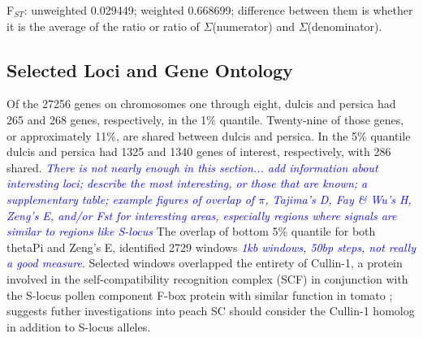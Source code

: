 \documentclass[12pt]{article}
\newcommand{\jri}[1]{\textcolor{red}{\emph{#1}}}
\newcommand{\dv}[1]{\textcolor{blue}{\emph{#1}}}
\begin{document}
F$_{ST}$: unweighted 0.029449; weighted 0.668699; difference between them is whether it is the average of the ratio or ratio of $\Sigma$(numerator) and $\Sigma$(denominator).

%
\subsection*{Selected Loci and Gene Ontology}
Of the 27256 genes on chromosomes one through eight, dulcis and persica had 265 and 268 genes, respectively, in the 1\% quantile. 
%
Twenty-nine of those genes, or approximately 11\%, are shared between dulcis and persica.
%
In the 5\% quantile dulcis and persica had 1325 and 1340 genes of interest, respectively, with 286 shared.
%
\dv{There is not nearly enough in this section... add information about interesting loci; describe the most interesting, or those that are known; a supplementary table; example figures of overlap of $\pi$, Tajima's D, Fay \& Wu's H, Zeng's E, and/or Fst for interesting areas, especially regions where signals are similar to regions like S-locus}
% 
The overlap of bottom 5\% quantile for both thetaPi and Zeng's E, identified 2729 windows \dv{1kb windows, 50bp steps, not really a good measure}. Selected windows overlapped the entirety of Cullin-1, a protein involved in the self-compatibility recognition complex (SCF) in conjunction with the S-locus pollen component F-box protein with similar function in tomato \cite{li2014role}; suggests futher investigations into peach SC should consider the Cullin-1 homolog in addition to S-locus alleles.
%
\end{document}
